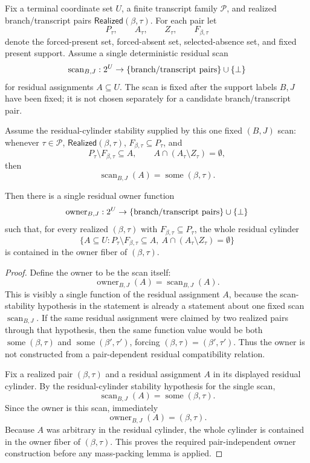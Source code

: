 \begin{helper}
Fix a terminal coordinate set \(U\), a finite transcript family
\(\mathcal P\), and realized branch/transcript pairs
\(\mathsf{Realized}(\beta,\tau)\).  For each pair let
\[
P_\tau,\qquad A_\tau,\qquad Z_\tau,\qquad F_{\beta,\tau}
\]
denote the forced-present set, forced-absent set, selected-absence set, and
fixed present support.  Assume a single deterministic residual scan
\[
\operatorname{scan}_{B,J}:2^U\to
  \{\hbox{branch/transcript pairs}\}\cup\{\bot\}
\]
for residual assignments \(A\subseteq U\).  The scan is fixed after the
support labels \(B,J\) have been fixed; it is not chosen separately for a
candidate branch/transcript pair.

Assume the residual-cylinder stability supplied by this one fixed
\((B,J)\) scan: whenever \(\tau\in\mathcal P\),
\(\mathsf{Realized}(\beta,\tau)\), \(F_{\beta,\tau}\subseteq P_\tau\), and
\[
P_\tau\setminus F_{\beta,\tau}\subseteq A,\qquad
A\cap(A_\tau\setminus Z_\tau)=\emptyset ,
\]
then
\[
\operatorname{scan}_{B,J}(A)=\operatorname{some}(\beta,\tau).
\]

Then there is a single residual owner function
\[
\operatorname{owner}_{B,J}:2^U\to
  \{\hbox{branch/transcript pairs}\}\cup\{\bot\}
\]
such that, for every realized \((\beta,\tau)\) with
\(F_{\beta,\tau}\subseteq P_\tau\), the whole residual cylinder
\[
\{A\subseteq U:
  P_\tau\setminus F_{\beta,\tau}\subseteq A,\ 
  A\cap(A_\tau\setminus Z_\tau)=\emptyset\}
\]
is contained in the owner fiber of \((\beta,\tau)\).
\end{helper}
\begin{proof}
Define the owner to be the scan itself:
\[
\operatorname{owner}_{B,J}(A)=\operatorname{scan}_{B,J}(A).
\]
This is visibly a single function of the residual assignment \(A\), because
the scan-stability hypothesis in the statement is already a statement about
one fixed scan \(\operatorname{scan}_{B,J}\).  If the same residual
assignment were claimed by two realized pairs through that hypothesis, then
the same function value would be both \(\operatorname{some}(\beta,\tau)\)
and \(\operatorname{some}(\beta',\tau')\), forcing
\((\beta,\tau)=(\beta',\tau')\).  Thus the owner is not constructed from a
pair-dependent residual compatibility relation.

Fix a realized pair \((\beta,\tau)\) and a residual assignment \(A\) in its
displayed residual cylinder.  By the residual-cylinder stability hypothesis
for the single scan,
\[
\operatorname{scan}_{B,J}(A)=\operatorname{some}(\beta,\tau).
\]
Since the owner is this scan, immediately
\[
\operatorname{owner}_{B,J}(A)=(\beta,\tau).
\]
Because \(A\) was arbitrary in the residual cylinder, the whole cylinder is
contained in the owner fiber of \((\beta,\tau)\).  This proves the required
pair-independent owner construction before any mass-packing lemma is
applied.
\end{proof}
